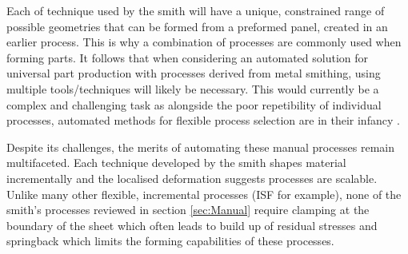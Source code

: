 

Each of technique used by the smith will have a unique, constrained range of possible geometries that can be formed from a preformed panel, created in an earlier process. This is why a combination of processes are commonly used when forming parts. It follows that when considering an automated solution for universal part production with processes derived from metal smithing, using multiple tools/techniques will likely be necessary. This would currently be a complex and challenging task as alongside the poor repetibility of individual processes, automated methods for flexible process selection are in their infancy \citep{Hamouche2018ClassificationLearning}.

Despite its challenges, the merits of automating these manual processes remain multifaceted. Each technique developed by the smith shapes material incrementally and the localised deformation suggests processes are scalable. Unlike many other flexible, incremental processes (ISF for example), none of the smith's processes reviewed in section \ref{sec:Manual} require clamping at the boundary of the sheet which often leads to build up of residual stresses and springback which limits the forming capabilities of these processes.

